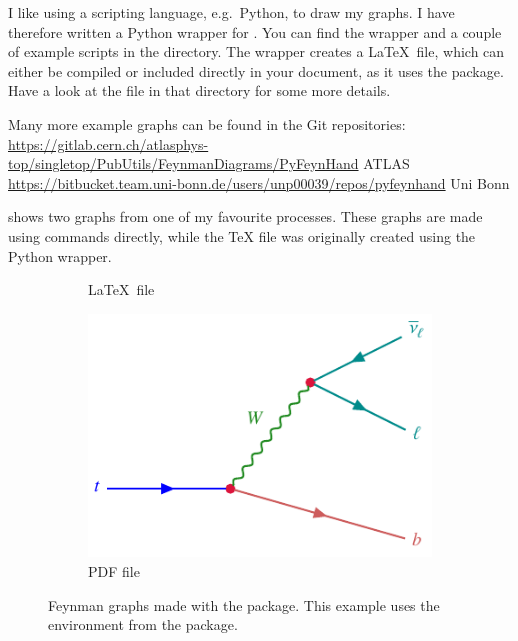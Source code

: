 I like using a scripting language, e.g.\ Python, to draw my graphs.
I have therefore written a Python wrapper for .
You can find the wrapper and a couple of example scripts in the  directory.
The wrapper creates a \LaTeX\ file,
which can either be compiled or included directly in your document,
as it uses the  package.
Have a look at the  file in that directory for some more details.

Many more example graphs can be found in the Git repositories:\\
{\footnotesize\url{https://gitlab.cern.ch/atlasphys-top/singletop/PubUtils/FeynmanDiagrams/PyFeynHand}} ATLAS\\
{\footnotesize\url{https://bitbucket.team.uni-bonn.de/users/unp00039/repos/pyfeynhand}} Uni Bonn

 shows two graphs from one of my favourite processes.
These graphs are made using  commands directly,
while the \TeX{} file was originally created using the Python wrapper.

\begin{figure}[htbp]
\begin{tcblisting}{}
\centering
\begin{subfigure}{0.5\figwidth}
  \centering
  \caption{\LaTeX\ file}%
  \label{fig:feyn:tdecay1}
\end{subfigure}
\qquad
\begin{subfigure}{0.5\figwidth}
  \centering
  \includegraphics[width=0.5\figwidth]{../tikz/tdecay}
  \caption{PDF file}%
  \label{fig:feyn:tdecay2}
\end{subfigure}
\caption{Feynman graphs made with the  package.
  This example uses the  environment from the  package.}%
\label{fig:feyn:tdecay}
\end{tcblisting}
\end{figure}

